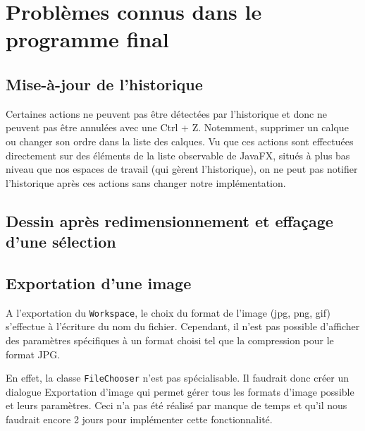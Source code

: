 \section{Problèmes connus dans le programme final}
\subsection{Mise-à-jour de l'historique}
Certaines actions ne peuvent pas être détectées par l'historique et donc ne peuvent pas être annulées avec une Ctrl + Z. Notemment, supprimer un calque ou changer son ordre dans la liste des calques. Vu que ces actions sont effectuées directement sur des éléments de la liste observable de JavaFX, situés à plus bas niveau que nos espaces de travail (qui gèrent l'historique), on ne peut pas notifier l'historique après ces actions sans changer notre implémentation.
\subsection{Dessin après redimensionnement et effaçage d'une sélection}

\subsection{Exportation d'une image}
A l'exportation du \texttt{Workspace}, le choix du format de l'image (jpg, png, gif) s'effectue à l'écriture du nom du fichier. Cependant, il n'est pas possible d'afficher des paramètres spécifiques à un format choisi tel que la compression pour le format JPG.

En effet, la classe \texttt{FileChooser} n'est pas spécialisable. Il faudrait donc créer un dialogue \og Exportation d'image \fg{} qui permet gérer tous les formats d'image possible et leurs paramètres. Ceci n'a pas été réalisé par manque de temps et qu'il nous faudrait encore 2 jours pour implémenter cette fonctionnalité. 